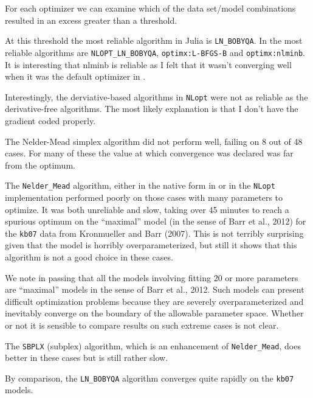 \documentclass[article]{jss}
\begin{document}
For each optimizer we can examine which of the data set/model
combinations resulted in an excess greater than a threshold.


    At this threshold the most reliable algorithm in Julia is
\texttt{LN\_BOBYQA}. In  the most reliable algorithms are
\texttt{NLOPT\_LN\_BOBYQA}, \texttt{optimx:L-BFGS-B} and
\texttt{optimx:nlminb}. It is interesting that nlminb is reliable as I
felt that it wasn't converging well when it was the default optimizer in
.

Interestingly, the derviative-based algorithms in \texttt{NLopt} were
not as reliable as the derivative-free algorithms. The most likely
explanation is that I don't have the gradient coded properly.

The Nelder-Mead simplex algorithm did not perform well, failing on 8 out
of 48 cases. For many of these the value at which convergence was
declared was far from the optimum.





 The \texttt{Nelder\_Mead} algorithm, either in the native form in
 or in the \texttt{NLopt} implementation performed poorly
on those cases with many parameters to optimize. It was both unreliable
and slow, taking over 45 minutes to reach a spurious optimum on the
``maximal'' model (in the sense of Barr et al., 2012) for the
\texttt{kb07} data from Kronmueller and Barr (2007). This is not
terribly surprising given that the model is horribly overparameterized,
but still it shows that this algorithm is not a good choice in these
cases.

We note in passing that all the models involving fitting 20 or more
parameters are ``maximal'' models in the sense of Barr et al., 2012.
Such models can present difficult optimization problems because they are
severely overparameterized and inevitably converge on the boundary of
the allowable parameter space. Whether or not it is sensible to compare
results on such extreme cases is not clear.

The \texttt{SBPLX} (subplex) algorithm, which is an enhancement of
\texttt{Nelder\_Mead}, does better in these cases but is still rather
slow.



  
    By comparison, the \texttt{LN\_BOBYQA} algorithm converges quite rapidly
on the \texttt{kb07} models.

        
        
        
\end{document}

